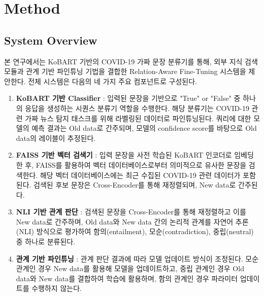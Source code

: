 \documentclass[a4paper,fleqn]{cas-sc}
\begin{document}
\section{Method}


\subsection{System Overview}

본 연구에서는 KoBART 기반의 COVID-19 가짜 문장 분류기를 통해, 외부 지식 검색 모듈과 관계 기반 파인튜닝 기법을 결합한 Relation-Aware Fine-Tuning 시스템을 제안한다. 
전체 시스템은 다음의 네 가지 주요 컴포넌트로 구성된다.

\begin{enumerate}
    \item\textbf{KoBART 기반 Classifier} :
    입력된 문장을 기반으로 "True" or "False" 중 하나의 응답을 생성하는 시퀀스 분류기 역할을 수행한다. 해당 분류기는 COVID-19 관련 가짜 뉴스 탐지 태스크를 위해 라벨링된 데이터로 파인튜닝된다.
    쿼리에 대한 모델의 예측 결과는 Old data로 간주되며, 모델의 confidence score를 바탕으로 Old data의 레이블이 추정된다.

    \item\textbf{FAISS 기반 벡터 검색기} : 
    입력 문장을 사전 학습된 KoBART 인코더로 임베딩한 후, FAISS를 활용하여 벡터 데이터베이스로부터 의미적으로 유사한 문장을 검색한다. 해당 벡터 데이터베이스에는 최근 수집된 COVID-19 관련 데이터가 포함된다.
    검색된 후보 문장은 Cross-Encoder를 통해 재정렬되며, New data로 간주된다.

    \item\textbf{NLI 기반 관계 판단} : 
    검색된 문장을 Cross-Encoder를 통해 재정렬하고 이를 New data로 간주하며, Old data와 New data 간의 논리적 관계를 자연어 추론(NLI) 방식으로 평가하여 함의(entailment), 모순(contradiction), 중립(neutral) 중 하나로 분류된다.
    
    \item\textbf{관계 기반 파인튜닝} : 
    관계 판단 결과에 따라 모델 업데이트 방식이 조정된다. 
    모순 관계인 경우 New data를 활용해 모델을 업데이트하고, 중립 관계인 경우 Old data와 New data를 결합하여 학습에 활용하며, 함의 관계인 경우 파라미터 업데이트를 수행하지 않는다.
\end{enumerate}
\end{document}
